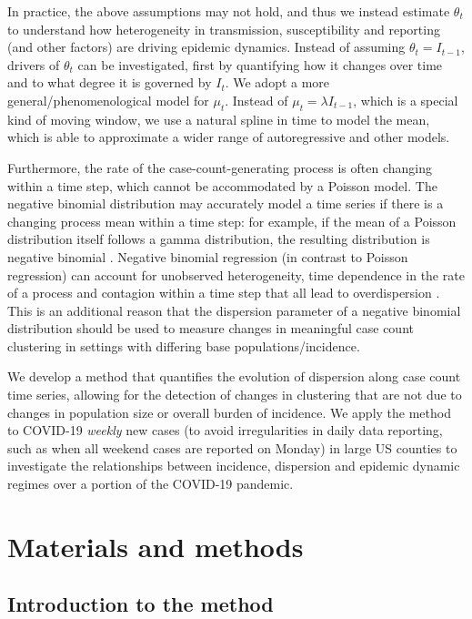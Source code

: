 \documentclass[10pt,letterpaper]{article}
\begin{document}
In practice, the above assumptions may not hold, and thus we instead estimate $\theta_t$ to understand how heterogeneity in transmission, susceptibility and reporting (and other factors) are driving epidemic dynamics. 
Instead of assuming $\theta_t = I_{t-1}$, drivers of $\theta_t$ can be investigated, first by quantifying how it changes over time and to what degree it is governed by $I_t$. 
We adopt a more general/phenomenological model for $\mu_t$. 
Instead of $\mu_t = \lambda I_{t-1}$, which is a special kind of moving window, we use a natural spline in time to model the mean, which is able to approximate a wider range of autoregressive and other models. 

Furthermore, the rate of the case-count-generating process is often changing within a time step, which cannot be accommodated by a Poisson model. 
The negative binomial distribution may accurately model a time series if there is a changing process mean within a time step: for example, if the mean of a Poisson distribution itself follows a gamma distribution, the resulting distribution is negative binomial \cite{cook_notes_nodate}. 
Negative binomial regression (in contrast to Poisson regression) can account for unobserved heterogeneity, time dependence in the rate of a process and contagion within a time step that all lead to overdispersion \cite{barron_analysis_1992}.
This is an additional reason that the dispersion parameter of a negative binomial distribution should be used to measure changes in meaningful case count clustering in settings with differing base populations/incidence. 

We develop a method that quantifies the evolution of dispersion along case count time series, allowing for the detection of changes in clustering that are not due to changes in population size or overall burden of incidence.
We apply the method to COVID-19 \emph{weekly} new cases (to avoid irregularities in daily data reporting, such as when all weekend cases are reported on Monday) in large US counties to investigate the relationships between incidence, dispersion and epidemic dynamic regimes over a portion of the COVID-19 pandemic. 

\section*{Materials and methods}
\subsection*{Introduction to the method}
\end{document}
